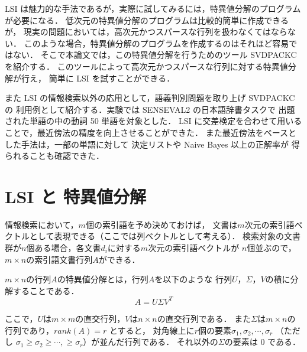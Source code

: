 LSI は魅力的な手法であるが，実際に試してみるには，特異値分解のプログラムが必要になる．
低次元の特異値分解のプログラムは比較的簡単に作成できるが，
現実の問題においては，高次元かつスパースな行列を扱わなくてはならない．
このような場合，特異値分解のプログラムを作成するのはそれほど容易ではない．
そこで本論文では，この特異値分解を行うためのツール SVDPACKC を紹介する．
このツールによって高次元かつスパースな行列に対する特異値分解が行え，
簡単に LSI を試すことができる．

また LSI の情報検索以外の応用として，語義判別問題を取り上げ SVDPACKC の
利用例として紹介する．実験では SENSEVAL2 の日本語辞書タスク\cite{sen2}で
出題された単語の中の動詞 50 単語を対象とした．
LSI に交差検定を合わせて用いることで，最近傍法\cite{ishii}の精度を向上させることができた．
また最近傍法をベースとした手法は，一部の単語に対して
決定リスト\cite{Yarowsky1}や Naive Bayes \cite{ml-text}以上の正解率が
得られることも確認できた．



\section{LSI と 特異値分解}


情報検索において，\( m \)個の索引語を予め決めておけば，
文書は\( m \)次元の索引語ベクトルとして表現できる（ここでは列ベクトルとして考える）．
検索対象の文書群が\( n \)個ある場合，各文書\( d_i \)に対する\( m \)次元の索引語ベクトルが
\( n \)個並ぶので，\( m \times n \)の索引語文書行列\( A \)ができる．

\( m \times n \)の行列\( A \)の特異値分解とは，行列\( A \)を以下のような
行列\( U \)，\( \Sigma \)，\( V \)の積に分解することである．
\begin{equation}
A = U  \Sigma  V^{T} \label{siki1}  
\end{equation}

\noindent
ここで，\( U \)は\( m \times m \)の直交行列，\( V \)は\( n \times n \)の直交行列である．
また\( \Sigma \)は\( m \times n \)の行列であり，\( rank(A) = r \) とすると，
対角線上に\( r \)個の要素\( \sigma_1, \sigma_2, \cdots, \sigma_r \)
（ただし \( \sigma_1 \ge \sigma_2 \ge \cdots, \ge \sigma_r\)）が並んだ行列である．
それ以外の\( \Sigma \)の要素は 0 である．

